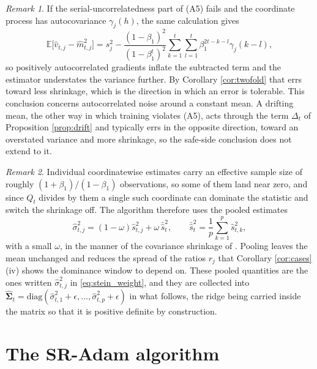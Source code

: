 \documentclass[a4paper,fleqn]{cas-sc}
\theoremstyle{plain}
\theoremstyle{definition}
\theoremstyle{remark}
\newtheorem{remark}{Remark}
\newcommand{\rev}[1]{#1}
\newcommand{\diag}{\mathrm{diag}}
\newcommand{\E}{\mathbb{E}}
\begin{document}
\begin{remark}
\label{rem:a5}
If the serial-uncorrelatedness part of (A5) fails and the coordinate process has autocovariance $\gamma_j(h)$, the same calculation gives
\begin{equation}
\E\bigl[\hat v_{t,j}-\hat m^2_{t,j}\bigr]
=
s^2_j-\frac{(1-\beta_1)^2}{(1-\beta_1^{t})^{2}}\sum_{k=1}^{t}\sum_{l=1}^{t}\beta_1^{2t-k-l}\gamma_j(k-l),
\end{equation}
so positively autocorrelated gradients inflate the subtracted term and the estimator understates the variance further. By Corollary \ref{cor:twofold} that errs toward less shrinkage, which is the direction in which an error is tolerable. \rev{This conclusion concerns autocorrelated noise around a constant mean. A drifting mean, the other way in which training violates (A5), acts through the term $\Delta_t$ of Proposition \ref{prop:drift} and typically errs in the opposite direction, toward an overstated variance and more shrinkage, so the safe-side conclusion does not extend to it.}
\end{remark}

\begin{remark}
\label{rem:pooling}
Individual coordinatewise estimates carry an effective sample size of roughly $(1+\beta_1)/(1-\beta_1)$ observations, so some of them land near zero, and since $Q_t$ divides by them a single such coordinate can dominate the statistic and switch the shrinkage off. The algorithm therefore uses the pooled estimates
\begin{equation}
\label{eq:pooled}
\hat\sigma^2_{t,j}=(1-\omega)\hat s^2_{t,j}+\omega\,\bar{\hat s}^2_t,
\qquad
\bar{\hat s}^2_t=\frac1p\sum_{k=1}^{p}\hat s^2_{t,k},
\end{equation}
with a small $\omega$, in the manner of the covariance shrinkage of \citet{ledoit2004}. Pooling leaves the mean unchanged and reduces the spread of the ratios $r_j$ that Corollary \ref{cor:cases}(iv) shows the dominance window to depend on. These pooled quantities are the ones written $\hat\sigma^2_{t,j}$ in \eqref{eq:stein_weight}, and they are collected into $\widehat{\bm\Sigma}_t=\diag(\hat\sigma^2_{t,1}+\epsilon,\dots,\hat\sigma^2_{t,p}+\epsilon)$ in what follows, the ridge being carried inside the matrix so that it is positive definite by construction.
\end{remark}

\section{The SR-Adam algorithm}
\label{sec:algorithm}
\end{document}
